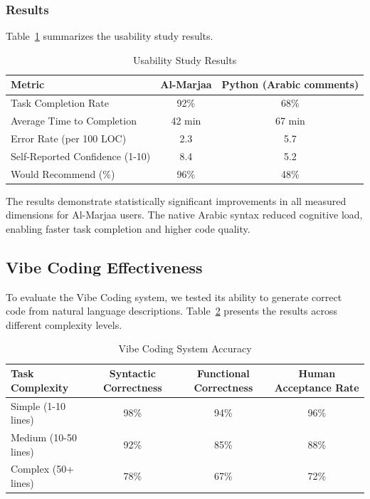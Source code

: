 \documentclass[11pt,a4paper]{article}
\begin{document}
\subsubsection{Results}

Table~\ref{tab:usability} summarizes the usability study results.

\begin{table}[h]
\centering
\caption{Usability Study Results}
\label{tab:usability}
\begin{tabular}{@{}lcc@{}}
\toprule
\textbf{Metric} & \textbf{Al-Marjaa} & \textbf{Python (Arabic comments)} \\
\midrule
Task Completion Rate & 92\% & 68\% \\
Average Time to Completion & 42 min & 67 min \\
Error Rate (per 100 LOC) & 2.3 & 5.7 \\
Self-Reported Confidence (1-10) & 8.4 & 5.2 \\
Would Recommend (\%) & 96\% & 48\% \\
\bottomrule
\end{tabular}
\end{table}

The results demonstrate statistically significant improvements in all measured dimensions for Al-Marjaa users. The native Arabic syntax reduced cognitive load, enabling faster task completion and higher code quality.

\subsection{Vibe Coding Effectiveness}

To evaluate the Vibe Coding system, we tested its ability to generate correct code from natural language descriptions. Table~\ref{tab:vibe} presents the results across different complexity levels.

\begin{table}[h]
\centering
\caption{Vibe Coding System Accuracy}
\label{tab:vibe}
\begin{tabular}{@{}lccc@{}}
\toprule
\textbf{Task Complexity} & \textbf{Syntactic Correctness} & \textbf{Functional Correctness} & \textbf{Human Acceptance Rate} \\
\midrule
Simple (1-10 lines) & 98\% & 94\% & 96\% \\
Medium (10-50 lines) & 92\% & 85\% & 88\% \\
Complex (50+ lines) & 78\% & 67\% & 72\% \\
\bottomrule
\end{tabular}
\end{table}
\end{document}
